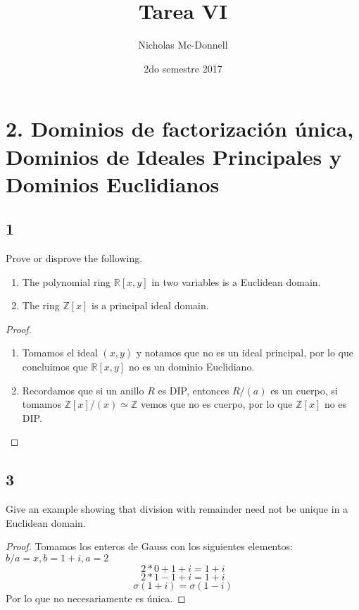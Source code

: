 \documentclass[11pt]{article}
\title{Tarea VI}
\author{Nicholas Mc-Donnell}
\date{2do semestre 2017}
\newcommand{\set}[1]{\mathbb{#1}}
\theoremstyle{definition}
\begin{document}
        \maketitle
        \newpage
        
        \clearpage\null\newpage

        \tableofcontents
        \newpage

        \clearpage\null\newpage
    \section{2. Dominios de factorización única, Dominios de Ideales Principales y Dominios Euclidianos}
    \subsection{1}
    Prove or disprove the following.
    \begin{enumerate}[label=\textbf{(\alph*)}]
        \item The polynomial ring $\set{R}[x,y]$ in two variables is a Euclidean domain.

        \item The ring $\set{Z}[x]$ is a principal ideal domain.
    \end{enumerate}
    \begin{proof}
        \
        \begin{enumerate}[label=\textbf{(\alph*)}]
            \item Tomamos el ideal $(x,y)$ y notamos que no es un ideal principal, por lo que concluimos que $\set{R}[x,y]$ no es un dominio Euclidiano.
    
            \item Recordamos que si un anillo $R$ es DIP, entonces $R/(a)$ es un cuerpo, si tomamos $\set{Z}[x]/(x)\simeq \set{Z}$ vemos que no es cuerpo, por lo que $\set{Z}[x]$ no es DIP.
        \end{enumerate}
    \end{proof}
    
    \subsection{3}
    Give an example showing that division with remainder need not be unique in a Euclidean domain.
    \begin{proof}
        Tomamos los enteros de Gauss con los siguientes elementos: $b/a=x, b=1+i, a=2$
        \[2*0+1+i=1+i\]
        \[2*1-1+i=1+i\]
        \[\sigma(1+i)=\sigma(1-i)\]
        Por lo que no necesariamente es única.
    \end{proof}
\end{document}
